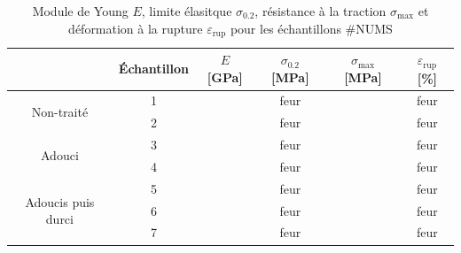 \begin{table}[h]
    \centering
    \begin{tabular}{ |c||c|c|c|c|c| }
        \cline{2-6}
        \multicolumn{1}{c|}{} & Échantillon & \(E\) [GPa] & \(\sigma_{0.2}\) [MPa] & \(\sigma_{\textrm{max}}\) [MPa] & \(\varepsilon_{\textrm{rup}}\) [\%] \\
        \hline
        \multirow{2}{4cm}{Non-traité} & 1 &  & feur &  & feur \\
        & 2 &  & feur &  & feur \\
        \hline
        \multirow{2}{4cm}{Adouci} & 3 &  & feur &  & feur \\
        & 4 &  & feur &  & feur \\
        \hline
        \multirow{3}{4cm}{Adoucis puis durci} & 5 &  & feur &  & feur \\
        & 6 &  & feur &  & feur \\
        & 7 &  & feur &  & feur \\
        \hline
    \end{tabular}
    \caption{Module de Young \(E\), limite élasitque \(\sigma_{0.2}\), résistance à la traction \(\sigma_{\textrm{max}}\) et déformation à la rupture \(\varepsilon_{\textrm{rup}}\) pour les échantillons \#NUMS}
    \label{tab:results}
\end{table}